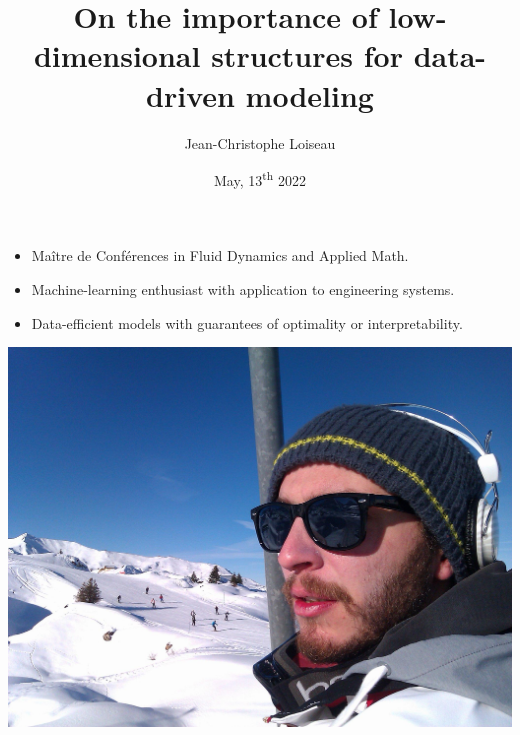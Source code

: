 \documentclass[aspectratio=169, usenames, dvipsnames]{beamer}
\title{On the importance of low-dimensional structures for data-driven modeling}
\author[JC]{Jean-Christophe Loiseau}
\date[]{May, 13\textsuperscript{th} 2022}
\begin{document}
\begin{frame}
  \titlepage
\end{frame}







\begin{frame}
  \vfill
  \begin{minipage}{.68\textwidth}
    \begin{itemize}
    \item Maître de Conférences in Fluid Dynamics and Applied Math.

      \bigskip

    \item Machine-learning enthusiast with application to engineering systems.

      \bigskip

    \item Data-efficient models with guarantees of optimality or interpretability.
    \end{itemize}
  \end{minipage}%
  \hfill
  \begin{minipage}{.28\textwidth}
    \includegraphics[width=\textwidth]{myself}
  \end{minipage}

  \vfill
\end{frame}
\end{document}
